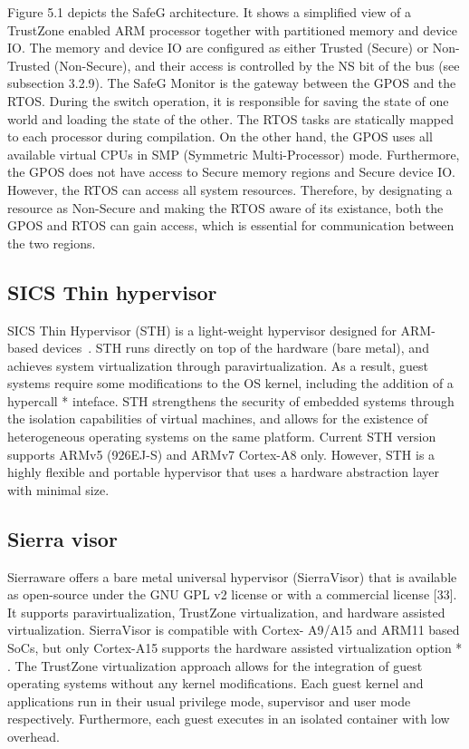 Figure 5.1 depicts the SafeG architecture. It shows a simplified view of a TrustZone enabled ARM processor together with partitioned memory and device IO. The memory and device IO are configured as either Trusted (Secure) or Non-Trusted (Non-Secure), and their access is controlled by the NS bit of the bus (see subsection 3.2.9). The SafeG Monitor is the gateway between the GPOS and the RTOS. During the switch operation, it is responsible for saving the state of one world and loading the state of the other. The RTOS tasks are statically mapped to each processor during compilation. On the other hand, the GPOS uses all available virtual CPUs in SMP (Symmetric Multi-Processor) mode. Furthermore, the GPOS does not have access to Secure memory regions and Secure device IO. However, the RTOS can access all system resources. Therefore, by designating a resource as Non-Secure and making the RTOS aware of its existance, both the GPOS and RTOS can gain access, which is essential for communication between the two regions.

\subsection{SICS Thin hypervisor}
SICS Thin Hypervisor (STH) is a light-weight hypervisor designed for ARM-
based devices~\cite{STH2013}. STH runs directly on top of the hardware (bare metal),
and achieves system virtualization through paravirtualization. As a result,
guest systems require some modifications to the OS kernel, including the
addition of a hypercall * inteface. STH strengthens the security of embedded
systems through the isolation capabilities of virtual machines, and allows
for the existence of heterogeneous operating systems on the same platform.
Current STH version supports ARMv5 (926EJ-S) and ARMv7 Cortex-A8
only. However, STH is a highly flexible and portable hypervisor that uses a
hardware abstraction layer with minimal size.

\subsection{Sierra visor}
Sierraware offers a bare metal universal hypervisor (SierraVisor) that is
available as open-source under the GNU GPL v2 license or with a commercial
license [33]. It supports paravirtualization, TrustZone virtualization, and
hardware assisted virtualization. SierraVisor is compatible with Cortex-
A9/A15 and ARM11 based SoCs, but only Cortex-A15 supports the
hardware assisted virtualization option * . The TrustZone virtualization
approach allows for the integration of guest operating systems without any
kernel modifications. Each guest kernel and applications run in their usual
privilege mode, supervisor and user mode respectively. Furthermore, each
guest executes in an isolated container with low overhead.

